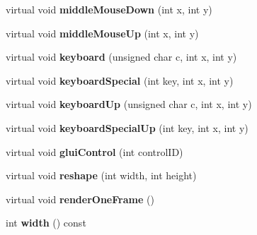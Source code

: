 \begin{DoxyCompactItemize}
\item 
\hypertarget{classBaseGfxApp_a2c98cae9bb5ad1fb1832a6d4812670f8}{virtual void {\bfseries middle\-Mouse\-Down} (int x, int y)}\label{classBaseGfxApp_a2c98cae9bb5ad1fb1832a6d4812670f8}

\item 
\hypertarget{classBaseGfxApp_a00fc05e8d9629b72302b5adf014bdb0c}{virtual void {\bfseries middle\-Mouse\-Up} (int x, int y)}\label{classBaseGfxApp_a00fc05e8d9629b72302b5adf014bdb0c}

\item 
\hypertarget{classBaseGfxApp_a6d91e0cb7a3d48cad33956efe7eb36ca}{virtual void {\bfseries keyboard} (unsigned char c, int x, int y)}\label{classBaseGfxApp_a6d91e0cb7a3d48cad33956efe7eb36ca}

\item 
\hypertarget{classBaseGfxApp_a345566e62c9e4ec3705ec4d1c4c75f1f}{virtual void {\bfseries keyboard\-Special} (int key, int x, int y)}\label{classBaseGfxApp_a345566e62c9e4ec3705ec4d1c4c75f1f}

\item 
\hypertarget{classBaseGfxApp_acc4a40ce11edd6b6660a19cb4802a2bf}{virtual void {\bfseries keyboard\-Up} (unsigned char c, int x, int y)}\label{classBaseGfxApp_acc4a40ce11edd6b6660a19cb4802a2bf}

\item 
\hypertarget{classBaseGfxApp_afd14b435ff93b1e7f461cb8bd1a6fd59}{virtual void {\bfseries keyboard\-Special\-Up} (int key, int x, int y)}\label{classBaseGfxApp_afd14b435ff93b1e7f461cb8bd1a6fd59}

\item 
\hypertarget{classBaseGfxApp_a2978a7c358794c67df73b66776b2cef3}{virtual void {\bfseries glui\-Control} (int control\-I\-D)}\label{classBaseGfxApp_a2978a7c358794c67df73b66776b2cef3}

\item 
\hypertarget{classBaseGfxApp_a89b85fe1c96fb33879cb8059649756b7}{virtual void {\bfseries reshape} (int width, int height)}\label{classBaseGfxApp_a89b85fe1c96fb33879cb8059649756b7}

\item 
\hypertarget{classBaseGfxApp_ae4177523e0853aba6e0d3ffc44ee5f33}{virtual void {\bfseries render\-One\-Frame} ()}\label{classBaseGfxApp_ae4177523e0853aba6e0d3ffc44ee5f33}

\item 
\hypertarget{classBaseGfxApp_ace089a1a94fb6bb0bc17e1b7fa48e05d}{int {\bfseries width} () const }\label{classBaseGfxApp_ace089a1a94fb6bb0bc17e1b7fa48e05d}


\end{DoxyCompactItemize}
